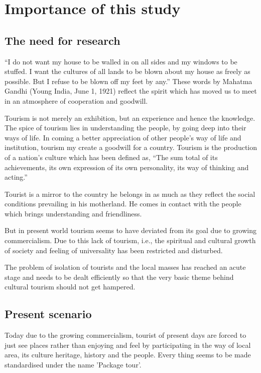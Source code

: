 \chapter{Importance of this study} %
\label{cha:ios}

\section{The need for research} %
\label{sec:nfr}

``I do not want my house to be walled in on all sides and my windows to be stuffed. I want the cultures of all lands to be blown about my house as freely as possible. But I refuse to be blown off my feet by any.'' These words by Mahatma Gandhi (Young India, June 1, 1921) reflect the spirit which has moved us to meet in an atmosphere of cooperation and goodwill.

Tourism is not merely an exhibition, but an experience and hence the knowledge. The spice of tourism lies in understanding the people, by going deep into their ways of life. In coming a better appreciation of other people's way of life and institution, tourism my create a goodwill for a country. Tourism is the production of a nation's culture which has been defined as, ``The sum total of its achievements, its own expression of its own personality, its way of thinking and acting.''

Tourist is a mirror to the country he belongs in as much as they reflect the social conditions prevailing in his motherland. He comes in contact with the people which brings understanding and friendliness.

But in present world tourism seems to have deviated from its goal due to growing commercialism. Due to this lack of tourism, i.e., the spiritual and cultural growth of society and feeling of universality has been restricted and disturbed.

The problem of isolation of tourists and the local masses has reached an acute stage and needs to be dealt efficiently so that the very basic theme behind cultural tourism should not get hampered.


\section{Present scenario} %
\label{sec:psc}

Today due to the growing commercialism, tourist of present days are forced to just see places rather than enjoying and feel by participating in the way of local area, its culture heritage, history and the people. Every thing seems to be made standardised under the name 'Package tour'.

